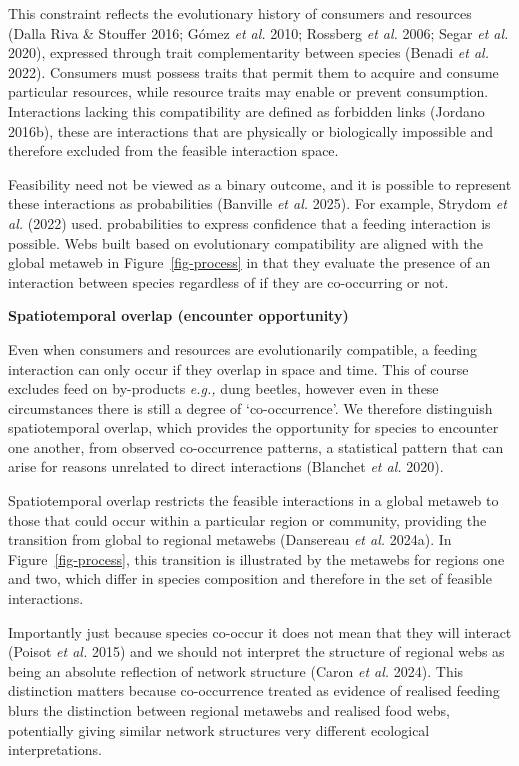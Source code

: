 \documentclass[
]{article}
\begin{document}
This constraint reflects the evolutionary history of consumers and
resources (Dalla Riva \& Stouffer 2016; Gómez \emph{et al.} 2010;
Rossberg \emph{et al.} 2006; Segar \emph{et al.} 2020), expressed
through trait complementarity between species (Benadi \emph{et al.}
2022). Consumers must possess traits that permit them to acquire and
consume particular resources, while resource traits may enable or
prevent consumption. Interactions lacking this compatibility are defined
as forbidden links (Jordano 2016b), these are interactions that are
physically or biologically impossible and therefore excluded from the
feasible interaction space.

Feasibility need not be viewed as a binary outcome, and it is possible
to represent these interactions as probabilities (Banville \emph{et al.}
2025). For example, Strydom \emph{et al.} (2022) used. probabilities to
express confidence that a feeding interaction is possible. Webs built
based on evolutionary compatibility are aligned with the global metaweb
in Figure~\ref{fig-process} in that they evaluate the presence of an
interaction between species regardless of if they are co-occurring or
not.

\textbf{Spatiotemporal overlap (encounter opportunity)}

Even when consumers and resources are evolutionarily compatible, a
feeding interaction can only occur if they overlap in space and time.
This of course excludes feed on by-products \emph{e.g.,} dung beetles,
however even in these circumstances there is still a degree of
`co-occurrence'. We therefore distinguish spatiotemporal overlap, which
provides the opportunity for species to encounter one another, from
observed co-occurrence patterns, a statistical pattern that can arise
for reasons unrelated to direct interactions (Blanchet \emph{et al.}
2020).

Spatiotemporal overlap restricts the feasible interactions in a global
metaweb to those that could occur within a particular region or
community, providing the transition from global to regional metawebs
(Dansereau \emph{et al.} 2024a). In Figure~\ref{fig-process}, this
transition is illustrated by the metawebs for regions one and two, which
differ in species composition and therefore in the set of feasible
interactions.

Importantly just because species co-occur it does not mean that they
will interact (Poisot \emph{et al.} 2015) and we should not interpret
the structure of regional webs as being an absolute reflection of
network structure (Caron \emph{et al.} 2024). This distinction matters
because co-occurrence treated as evidence of realised feeding blurs the
distinction between regional metawebs and realised food webs,
potentially giving similar network structures very different ecological
interpretations.
\end{document}
